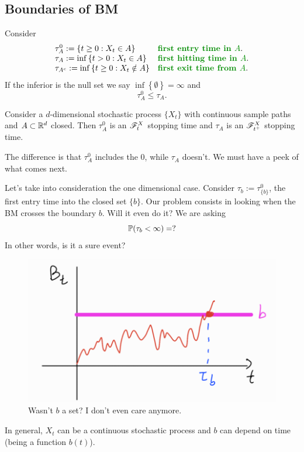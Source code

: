 \documentclass[12pt]{report}
\begin{document}
\subsection{Boundaries of BM}
Consider
\begin{equation*}
	\begin{array}{ll}
		\tau^{0}_{A}:=\left\{t\geq0:X_{t}\in A\right\}&\text{\emph{first entry time in $A$}.}\\
		\tau_{A}:=\inf\left\{t>0:X_{t}\in A\right\}&\text{\emph{first hitting time in $A$}.}\\
		\tau_{A^{c}}:=\inf\left\{t\geq0:X_{t}\notin A\right\}&\text{\emph{first exit time from $A$}.}
	\end{array}
\end{equation*}
If the inferior is the null set we say $\inf\left\{\emptyset\right\}=\infty$ and
\begin{equation*}
	\tau^{0}_{A}\leq\tau_{A}.
\end{equation*}
\begin{lemma}
	Consider a $d$-dimensional stochastic process $\{X_{t}\}$ with continuous sample paths and $A\subset\mathbb{R}^{d}$ closed. Then $\tau_{A}^{0}$ is an $\mathscr{F}_{t}^{X}$ stopping time and $\tau_{A}$ is an $\mathscr{F}_{t^{+}}^{X}$ stopping time.
\end{lemma}
The difference is  that $\tau_{A}^{0}$ includes the 0, while $\tau_{A}$ doesn't. We must have a peek of what comes next. \par
Let's take into consideration the one dimensional case. Consider $\tau_{b}:=\tau_{\{b\}}^{0}$, the first entry time into the closed set $\{b\}$. Our problem consists in looking when the BM crosses the boundary $b$. Will it even do it? We are asking 
\begin{equation*}
	\mathbb{P}(\tau_{b}<\infty)=?
\end{equation*}
In other words, is it a sure event?
\begin{figure}[H]
	\centering
	\includegraphics[width=0.5\linewidth]{img/screenshot016}
	\caption{Wasn't $b$ a set? I don't even care anymore.}
	\label{fig:screenshot016}
\end{figure}
In general, $X_{t}$ can be a continuous stochastic process and $b$ can depend on time (being a function $b(t)$).
\end{document}
